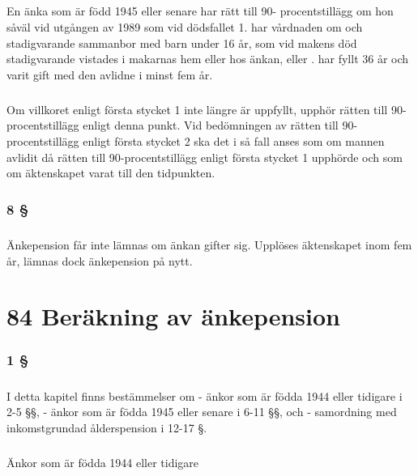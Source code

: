 \documentclass[a4paper,notitlepage,openany,10pt]{book}
\begin{document}
\paragraph*{}
En änka som är född 1945 eller senare har rätt till 90- procentstillägg om hon såväl vid utgången av 1989 som vid dödsfallet 1. har vårdnaden om och stadigvarande sammanbor med barn under 16 år, som vid makens död stadigvarande vistades i makarnas hem eller hos änkan, eller
. har fyllt 36 år och varit gift med den avlidne i minst fem år.
\paragraph*{}
Om villkoret enligt första stycket 1 inte längre är uppfyllt, upphör rätten till 90-procentstillägg enligt denna punkt. Vid bedömningen av rätten till 90-procentstillägg enligt första stycket 2 ska det i så fall anses som om mannen avlidit då rätten till 90-procentstillägg enligt första stycket 1 upphörde och som om äktenskapet varat till den tidpunkten.
\subsection*{8 §}
\paragraph*{}
Änkepension får inte lämnas om änkan gifter sig. Upplöses äktenskapet inom fem år, lämnas dock änkepension på nytt.
\chapter*{84 Beräkning av änkepension}
\subsection*{1 §}
\paragraph*{}
I detta kapitel finns bestämmelser om
\newline - änkor som är födda 1944 eller tidigare i 2-5 §§,
\newline - änkor som är födda 1945 eller senare i 6-11 §§, och
\newline - samordning med inkomstgrundad ålderspension i 12-17 §.
\paragraph*{}
Änkor som är födda 1944 eller tidigare
\end{document}
